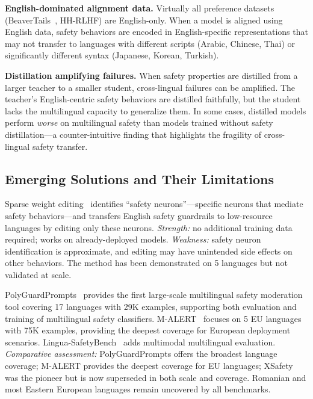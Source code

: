 \documentclass[12pt,a4paper]{article}
\begin{document}
\textbf{English-dominated alignment data.} Virtually all preference datasets (BeaverTails~\citep{ji2023beavertails}, HH-RLHF) are English-only. When a model is aligned using English data, safety behaviors are encoded in English-specific representations that may not transfer to languages with different scripts (Arabic, Chinese, Thai) or significantly different syntax (Japanese, Korean, Turkish).

\textbf{Distillation amplifying failures.} When safety properties are distilled from a larger teacher to a smaller student, cross-lingual failures can be amplified. The teacher's English-centric safety behaviors are distilled faithfully, but the student lacks the multilingual capacity to generalize them. In some cases, distilled models perform \emph{worse} on multilingual safety than models trained without safety distillation---a counter-intuitive finding that highlights the fragility of cross-lingual safety transfer.

\subsection{Emerging Solutions and Their Limitations}

Sparse weight editing~\citep{multilingualsparse2026} identifies ``safety neurons''---specific neurons that mediate safety behaviors---and transfers English safety guardrails to low-resource languages by editing only these neurons. \emph{Strength:} no additional training data required; works on already-deployed models. \emph{Weakness:} safety neuron identification is approximate, and editing may have unintended side effects on other behaviors. The method has been demonstrated on 5 languages but not validated at scale.

PolyGuardPrompts~\citep{polyguard2025} provides the first large-scale multilingual safety moderation tool covering 17 languages with 29K examples, supporting both evaluation and training of multilingual safety classifiers. M-ALERT~\citep{malert2025} focuses on 5 EU languages with 75K examples, providing the deepest coverage for European deployment scenarios. Lingua-SafetyBench~\citep{linguasafetybench2026} adds multimodal multilingual evaluation. \emph{Comparative assessment:} PolyGuardPrompts offers the broadest language coverage; M-ALERT provides the deepest coverage for EU languages; XSafety was the pioneer but is now superseded in both scale and coverage. Romanian and most Eastern European languages remain uncovered by all benchmarks.
\end{document}

